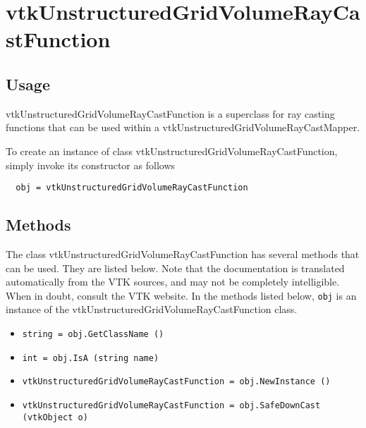 \section{vtkUnstructuredGridVolumeRayCastFunction}

\subsection{Usage}

 vtkUnstructuredGridVolumeRayCastFunction is a superclass for ray casting functions that 
 can be used within a vtkUnstructuredGridVolumeRayCastMapper. 

To create an instance of class vtkUnstructuredGridVolumeRayCastFunction, simply
invoke its constructor as follows
\begin{verbatim}
  obj = vtkUnstructuredGridVolumeRayCastFunction
\end{verbatim}
\subsection{Methods}

The class vtkUnstructuredGridVolumeRayCastFunction has several methods that can be used.
  They are listed below.
Note that the documentation is translated automatically from the VTK sources,
and may not be completely intelligible.  When in doubt, consult the VTK website.
In the methods listed below, \verb|obj| is an instance of the vtkUnstructuredGridVolumeRayCastFunction class.
\begin{itemize}
\item  \verb|string = obj.GetClassName ()|

\item  \verb|int = obj.IsA (string name)|

\item  \verb|vtkUnstructuredGridVolumeRayCastFunction = obj.NewInstance ()|

\item  \verb|vtkUnstructuredGridVolumeRayCastFunction = obj.SafeDownCast (vtkObject o)|

\end{itemize}
